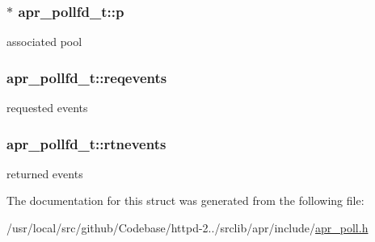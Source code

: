 \subsubsection[{\texorpdfstring{p}{p}}]{$\ast$ apr\+\_\+pollfd\+\_\+t\+::p}\hypertarget{structapr__pollfd__t_adae68586ed671472590efe8770de38cc}{}\label{structapr__pollfd__t_adae68586ed671472590efe8770de38cc}
associated pool 
\subsubsection[{\texorpdfstring{reqevents}{reqevents}}]{ apr\+\_\+pollfd\+\_\+t\+::reqevents}\hypertarget{structapr__pollfd__t_abcedac7097a97823a38ece6e47f4ea9f}{}\label{structapr__pollfd__t_abcedac7097a97823a38ece6e47f4ea9f}
requested events 
\subsubsection[{\texorpdfstring{rtnevents}{rtnevents}}]{ apr\+\_\+pollfd\+\_\+t\+::rtnevents}\hypertarget{structapr__pollfd__t_aed5b2109b27984975309922bfa84e3f6}{}\label{structapr__pollfd__t_aed5b2109b27984975309922bfa84e3f6}
returned events 

The documentation for this struct was generated from the following file\+:\begin{DoxyCompactItemize}
\item 
/usr/local/src/github/\+Codebase/httpd-\/2../srclib/apr/include/\hyperlink{apr__poll_8h}{apr\+\_\+poll.\+h}\end{DoxyCompactItemize}
